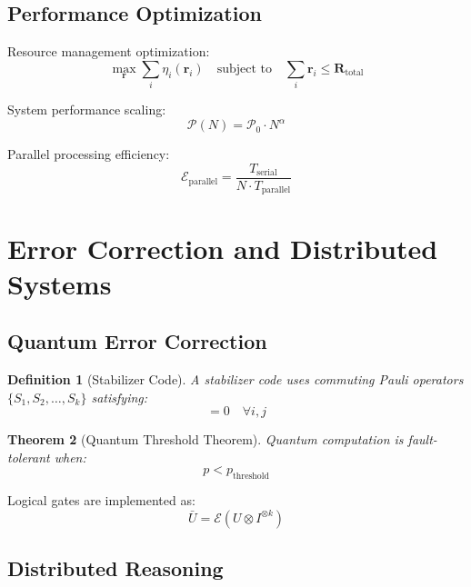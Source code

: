 \documentclass[12pt]{article}
\newtheorem{theorem}{Theorem}[section]
\newtheorem{definition}[theorem]{Definition}
\begin{document}
\subsection{Performance Optimization}

Resource management optimization:
\begin{equation}
\max_{\mathbf{r}} \sum_i \eta_i(\mathbf{r}_i) \quad \text{subject to} \quad \sum_i \mathbf{r}_i \leq \mathbf{R}_{\text{total}}
\end{equation}

System performance scaling:
\begin{equation}
\mathcal{P}(N) = \mathcal{P}_0 \cdot N^{\alpha}
\end{equation}

Parallel processing efficiency:
\begin{equation}
\mathcal{E}_{\text{parallel}} = \frac{T_{\text{serial}}}{N \cdot T_{\text{parallel}}}
\end{equation}

\section{Error Correction and Distributed Systems}

\subsection{Quantum Error Correction}

\begin{definition}[Stabilizer Code]
A stabilizer code uses commuting Pauli operators $\{S_1, S_2, \ldots, S_k\}$ satisfying:
\begin{equation}
[S_i, S_j] = 0 \quad \forall i, j
\end{equation}
\end{definition}

\begin{theorem}[Quantum Threshold Theorem]
Quantum computation is fault-tolerant when:
\begin{equation}
p < p_{\text{threshold}}
\end{equation}
\end{theorem}

Logical gates are implemented as:
\begin{equation}
\bar{U} = \mathcal{E}(U \otimes I^{\otimes k})
\end{equation}

\subsection{Distributed Reasoning}
\end{document}
